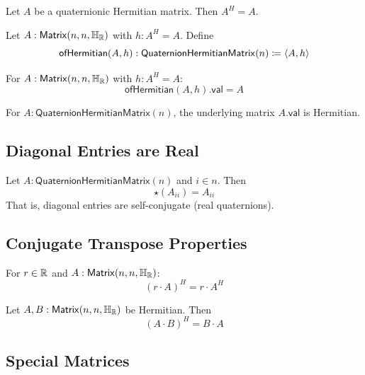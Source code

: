 \begin{theorem}[conjTranspose\_eq]
Let $A$ be a quaternionic Hermitian matrix. Then $A^H = A$.
\end{theorem}

\begin{definition}[ofHermitian]
Let $A : \mathsf{Matrix}(n, n, \mathbb{H}_{\mathbb{R}})$ with $h : A^H = A$. Define
\[ \mathsf{ofHermitian}(A, h) : \mathsf{QuaternionHermitianMatrix}(n) \coloneqq \langle A, h \rangle \]
\end{definition}

\begin{lemma}
For $A : \mathsf{Matrix}(n, n, \mathbb{H}_{\mathbb{R}})$ with $h : A^H = A$:
\[ \mathsf{ofHermitian}(A, h).\mathsf{val} = A \]
\end{lemma}

\begin{theorem}
For $A : \mathsf{QuaternionHermitianMatrix}(n)$, the underlying matrix $A.\mathsf{val}$ is Hermitian.
\end{theorem}

\subsection{Diagonal Entries are Real}

\begin{theorem}
Let $A : \mathsf{QuaternionHermitianMatrix}(n)$ and $i \in n$. Then
\[ \star(A_{ii}) = A_{ii} \]
That is, diagonal entries are self-conjugate (real quaternions).
\end{theorem}

\subsection{Conjugate Transpose Properties}

\begin{theorem}
For $r \in \mathbb{R}$ and $A : \mathsf{Matrix}(n, n, \mathbb{H}_{\mathbb{R}})$:
\[ (r \cdot A)^H = r \cdot A^H \]
\end{theorem}

\begin{theorem}
Let $A, B : \mathsf{Matrix}(n, n, \mathbb{H}_{\mathbb{R}})$ be Hermitian. Then
\[ (A \cdot B)^H = B \cdot A \]
\end{theorem}

\subsection{Special Matrices}

